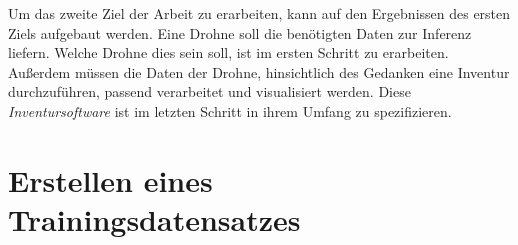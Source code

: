 Um das zweite Ziel der Arbeit zu erarbeiten, kann auf den Ergebnissen des ersten Ziels aufgebaut werden. Eine Drohne soll die benötigten Daten zur Inferenz liefern. Welche Drohne dies sein soll, ist im ersten Schritt zu erarbeiten. Außerdem müssen die Daten der Drohne, hinsichtlich des Gedanken eine Inventur durchzuführen, passend verarbeitet und visualisiert werden. Diese \textit{Inventursoftware} ist im letzten Schritt in ihrem Umfang zu spezifizieren.

\section{Erstellen eines Trainingsdatensatzes} \label{traindata}

\begin{figure}[H]
	\hfill
	\hfill
	\hfill
	\hfill
	\hfill
	\hfill

\end{figure}
